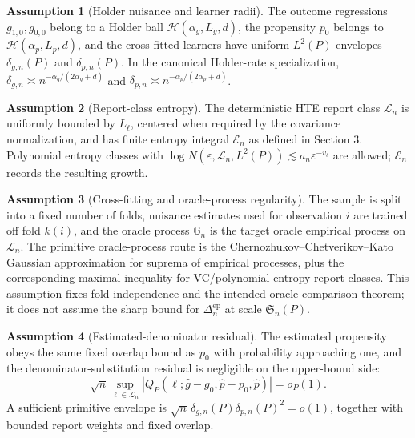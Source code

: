 \documentclass[11pt]{article}
\theoremstyle{definition}
\newtheorem{assumption}{Assumption}
\theoremstyle{plain}
\theoremstyle{remark}
\begin{document}
\begin{assumption}[Holder nuisance and learner radii]\label{ass:holder}
The outcome regressions \(g_{1,0},g_{0,0}\) belong to a Holder ball
\(\mathcal{H}(\alpha_g,L_g,d)\), the propensity \(p_0\) belongs to
\(\mathcal{H}(\alpha_p,L_p,d)\), and the cross-fitted learners have uniform
\(L^2(P)\) envelopes \(\delta_{g,n}(P)\) and \(\delta_{p,n}(P)\).  In the
canonical Holder-rate specialization,
\(\delta_{g,n}\asymp n^{-\alpha_g/(2\alpha_g+d)}\) and
\(\delta_{p,n}\asymp n^{-\alpha_p/(2\alpha_p+d)}\).
\end{assumption}

\begin{assumption}[Report-class entropy]\label{ass:entropy}
The deterministic HTE report class \(\mathcal{L}_n\) is uniformly bounded by
\(L_\ell\), centered when required by the covariance normalization, and has
finite entropy integral \(\mathcal{E}_n\) as defined in Section 3.  Polynomial
entropy classes with \(\log N(\varepsilon,\mathcal{L}_n,L^2(P))\lesssim
a_n\varepsilon^{-v_\ell}\) are allowed; \(\mathcal{E}_n\) records the resulting
growth.
\end{assumption}

\begin{assumption}[Cross-fitting and oracle-process regularity]\label{ass:crossfit}
The sample is split into a fixed number of folds, nuisance estimates used for
observation \(i\) are trained off fold \(k(i)\), and the oracle process
\(\mathbb{G}_n\) is the target oracle empirical process on
\(\mathcal{L}_n\).  The primitive oracle-process route is the
Chernozhukov--Chetverikov--Kato Gaussian approximation for suprema of empirical
processes, plus the corresponding maximal inequality for VC/polynomial-entropy
report classes.  This assumption fixes fold independence and the intended
oracle comparison theorem; it does not assume the sharp bound for
\(\Delta^{\mathrm{ep}}_n\) at scale \(\mathfrak{S}_n(P)\).
\end{assumption}

\begin{assumption}[Estimated-denominator residual]\label{ass:denominator}
The estimated propensity obeys the same fixed overlap bound as \(p_0\) with
probability approaching one, and the denominator-substitution residual is
negligible on the upper-bound side:
\[
\sqrt n\sup_{\ell\in\mathcal{L}_n}
\left|Q_P(\ell;\hat g-g_0,\hat p-p_0,\hat p)\right|=o_P(1).
\]
A sufficient primitive envelope is
\(\sqrt n\,\delta_{g,n}(P)\delta_{p,n}(P)^2=o(1)\), together with bounded
report weights and fixed overlap.
\end{assumption}
\end{document}
